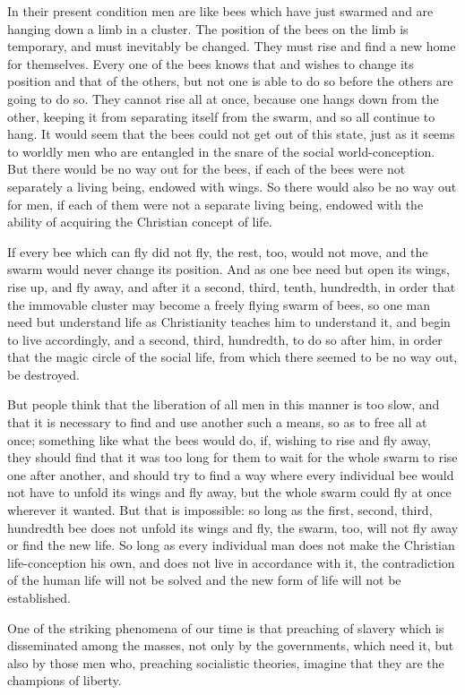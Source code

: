 \documentclass{book}
\begin{document}
In their present condition men are like bees which have just swarmed and are hanging down a limb in a cluster. The position of the bees on the limb is temporary, and must inevitably be changed. They must rise and find a new home for themselves. Every one of the bees knows that and wishes to change its position and that of the others, but not one is able to do so before the others are going to do so. They cannot rise all at once, because one hangs down from the other, keeping it from separating itself from the swarm, and so all continue to hang. It would seem that the bees could not get out of this state, just as it seems to worldly men who are entangled in the snare of the social world-conception. But there would be no way out for the bees, if each of the bees were not separately a living being, endowed with wings. So there would also be no way out for men, if each of them were not a separate living being, endowed with the ability of acquiring the Christian concept of life.

If every bee which can fly did not fly, the rest, too, would not move, and the swarm would never change its position. And as one bee need but open its wings, rise up, and fly away, and after it a second, third, tenth, hundredth, in order that the immovable cluster may become a freely flying swarm of bees, so one man need but understand life as Christianity teaches him to understand it, and begin to live accordingly, and a second, third, hundredth, to do so after him, in order that the magic circle of the social life, from which there seemed to be no way out, be destroyed.

But people think that the liberation of all men in this manner is too slow, and that it is necessary to find and use another such a means, so as to free all at once; something like what the bees would do, if, wishing to rise and fly away, they should find that it was too long for them to wait for the whole swarm to rise one after another, and should try to find a way where every individual bee would not have to unfold its wings and fly away, but the whole swarm could fly at once wherever it wanted. But that is impossible: so long as the first, second, third, hundredth bee does not unfold its wings and fly, the swarm, too, will not fly away or find the new life. So long as every individual man does not make the Christian life-conception his own, and does not live in accordance with it, the contradiction of the human life will not be solved and the new form of life will not be established.

One of the striking phenomena of our time is that preaching of slavery which is disseminated among the masses, not only by the governments, which need it, but also by those men who, preaching socialistic theories, imagine that they are the champions of liberty.
\end{document}
